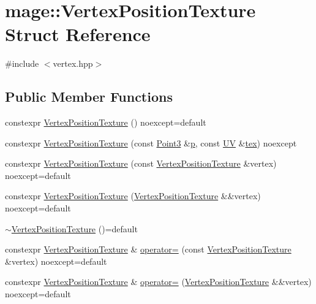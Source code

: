 \hypertarget{structmage_1_1_vertex_position_texture}{}\section{mage\+:\+:Vertex\+Position\+Texture Struct Reference}
\label{structmage_1_1_vertex_position_texture}


{\ttfamily \#include $<$vertex.\+hpp$>$}

\subsection*{Public Member Functions}
\begin{DoxyCompactItemize}
\item 
constexpr \hyperlink{structmage_1_1_vertex_position_texture_a379985c00ba410c173e1e1c269ae33ee}{Vertex\+Position\+Texture} () noexcept=default
\item 
constexpr \hyperlink{structmage_1_1_vertex_position_texture_a3370852aca7ddbcb58f9c0629683649b}{Vertex\+Position\+Texture} (const \hyperlink{structmage_1_1_point3}{Point3} \&\hyperlink{structmage_1_1_vertex_position_texture_a49253c4db52d1a4905838ba6ed6c52c6}{p}, const \hyperlink{structmage_1_1_u_v}{UV} \&\hyperlink{structmage_1_1_vertex_position_texture_a9b4efa25d268c812892ecffc2582496e}{tex}) noexcept
\item 
constexpr \hyperlink{structmage_1_1_vertex_position_texture_a307510d9872cb526330751e6f7605907}{Vertex\+Position\+Texture} (const \hyperlink{structmage_1_1_vertex_position_texture}{Vertex\+Position\+Texture} \&vertex) noexcept=default
\item 
constexpr \hyperlink{structmage_1_1_vertex_position_texture_a0541fd3614929d9a75ba172f7d3995e7}{Vertex\+Position\+Texture} (\hyperlink{structmage_1_1_vertex_position_texture}{Vertex\+Position\+Texture} \&\&vertex) noexcept=default
\item 
\hyperlink{structmage_1_1_vertex_position_texture_abafd9b5ff2067834916b522d58b5764f}{$\sim$\+Vertex\+Position\+Texture} ()=default
\item 
constexpr \hyperlink{structmage_1_1_vertex_position_texture}{Vertex\+Position\+Texture} \& \hyperlink{structmage_1_1_vertex_position_texture_ad58b6157a9ec702b42a56037db1d41d3}{operator=} (const \hyperlink{structmage_1_1_vertex_position_texture}{Vertex\+Position\+Texture} \&vertex) noexcept=default
\item 
constexpr \hyperlink{structmage_1_1_vertex_position_texture}{Vertex\+Position\+Texture} \& \hyperlink{structmage_1_1_vertex_position_texture_a0f4ffdfe65108d6bac7c2688bcd8f91d}{operator=} (\hyperlink{structmage_1_1_vertex_position_texture}{Vertex\+Position\+Texture} \&\&vertex) noexcept=default
\end{DoxyCompactItemize}

